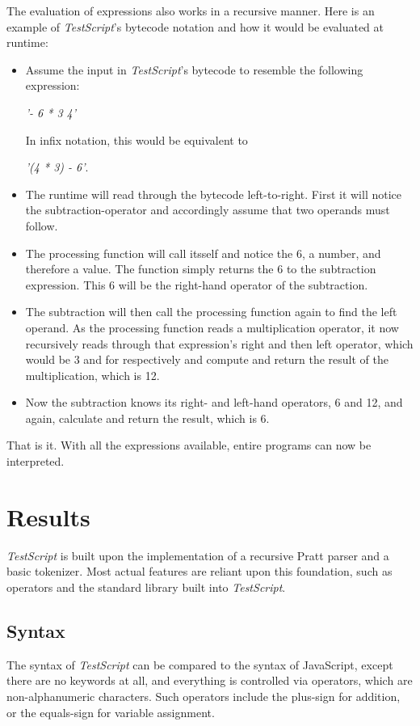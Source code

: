 \documentclass[12pt,a4paper]{article}
\newcommand{\expr}[1] {
    \begin{center}
        #1
    \end{center}
}
\newcommand{\name}{\emph{TestScript}}
\begin{document}
The evaluation of expressions also works in a recursive manner. Here is an 
example of \name{}'s bytecode notation and how it would be evaluated at runtime:
\begin{itemize}
    \item Assume the input in \name{}'s bytecode to resemble the following expression: 
        \expr{\emph{'- 6 * 3 4'}}
        In infix notation, this would be equivalent to 
        \expr{\emph{'(4 * 3) - 6'}.}
    \item The runtime will read through the bytecode left-to-right. First it will
        notice the subtraction-operator and accordingly assume that two
        operands must follow.
    \item The processing function will call itsself
        and notice the 6, a number, and therefore a value. The function simply returns the 6
        to the subtraction expression. This 6 will be the right-hand operator
        of the subtraction.
    \item The subtraction will then call the processing function again to find
        the left operand. As the processing function reads a multiplication operator,
        it now recursively reads through that expression's right and then left
        operator, which would be 3 and for respectively and compute and return
        the result of the multiplication, which is 12.
    \item Now the subtraction knows its right- and left-hand operators, 6 and 12,
        and again, calculate and return the result, which is 6.
\end{itemize}

That is it. With all the expressions available, entire programs
can now be interpreted.

\section{Results}

\name{} is built upon the implementation of a recursive Pratt
parser and a basic tokenizer. Most actual features are reliant upon this
foundation, such as operators and the standard library built into \name{}.

\subsection{Syntax}
The syntax of \name{} can be compared to the syntax of JavaScript, except
there are no keywords at all, and everything is controlled via operators,
which are non-alphanumeric characters. Such operators include the plus-sign 
for addition, or the equals-sign for variable assignment.
\end{document}
